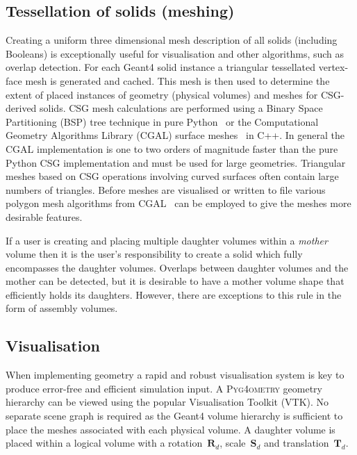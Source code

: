 \documentclass[final,5p,times,twocolumn]{elsarticle}
\newcommand{\PYGEOMETRY}{\textsc{Pyg4ometry}}
\begin{document}
\subsection{Tessellation of solids (meshing)}
Creating a uniform three dimensional mesh description of all solids (including Booleans) is exceptionally useful for visualisation and other algorithms, such as overlap 
detection. For each Geant4 solid instance a triangular tessellated vertex-face mesh is generated and cached. This mesh is then used to determine the extent 
of placed instances of geometry (physical volumes) and meshes for CSG-derived solids. CSG mesh calculations are performed using a Binary Space Partitioning 
(BSP) tree technique in pure Python~\cite{pycsg} or the Computational Geometry Algorithms Library (CGAL) surface meshes~\cite{cgal:bsmf-sm-20b} in C++. In 
general the CGAL implementation is one to two orders of magnitude faster than the pure Python CSG implementation and must be used for large geometries. 
Triangular meshes based on CSG operations involving curved surfaces often contain large numbers of triangles. Before meshes are visualised or written to file 
various polygon mesh algorithms  from CGAL~\cite{cgal:lty-pmp-20b} can be employed to give the meshes more desirable features. 

If a user is creating and placing multiple daughter volumes within a \emph{mother} volume then it is the user's responsibility to create a solid which fully 
encompasses the daughter volumes. Overlaps between daughter volumes and the mother can be detected, but it is desirable 
to have a mother volume shape that efficiently holds its daughters. However, there are exceptions to this rule in the form of assembly volumes. 
 
\subsection{Visualisation} \label{sec:visualisation}
When implementing geometry a rapid and robust visualisation system is key to produce error-free and efficient simulation input.
A  \PYGEOMETRY{} geometry hierarchy can be viewed using the popular Visualisation Toolkit (VTK). No separate scene graph is required as the Geant4 
volume hierarchy is sufficient to place the meshes associated with each physical volume. A daughter volume is placed within a logical volume with a
rotation~$\mathbf{R}_d$, scale~$\mathbf{S}_d$ and translation~$\mathbf{T}_d$.
\end{document}
